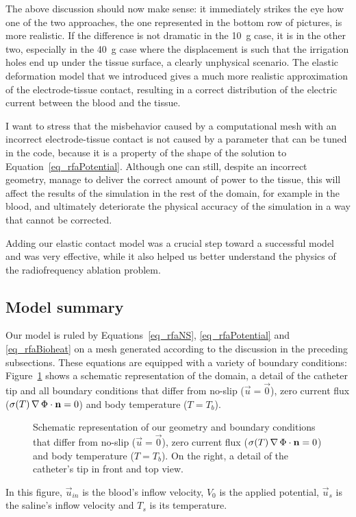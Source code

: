 The above discussion should now make sense: it immediately strikes the eye how one of the two approaches, the one represented in the bottom row of pictures, is more realistic.
If the difference is not dramatic in the \SI{10}{g} case, it is in the other two, especially in the \SI{40}{g} case where the displacement is such that the irrigation holes end up under the tissue surface, a clearly unphysical scenario.
The elastic deformation model that we introduced gives a much more realistic approximation of the electrode-tissue contact, resulting in a correct distribution of the electric current between the blood and the tissue.

I want to stress that the misbehavior caused by a computational mesh with an incorrect electrode-tissue contact is not caused by a parameter that can be tuned in the code, because it is a property of the shape of the solution to Equation~\eqref{eq_rfaPotential}.
Although one can still, despite an incorrect geometry, manage to deliver the correct amount of power to the tissue, this will affect the results of the simulation in the rest of the domain, for example in the blood, and ultimately deteriorate the physical accuracy of the simulation in a way that cannot be corrected.

Adding our elastic contact model was a crucial step toward a successful model and was very effective, while it also helped us better understand the physics of the radiofrequency ablation problem.


\subsection{Model summary}
\label{sub_rfaSummary}
Our model is ruled by Equations~\eqref{eq_rfaNS}, \eqref{eq_rfaPotential} and \eqref{eq_rfaBioheat} on a mesh generated according to the discussion in the preceding subsections.
These equations are equipped with a variety of boundary conditions: Figure~\ref{fig_rfa_bcs} shows a schematic representation of the domain, a detail of the catheter tip and all boundary conditions that differ from no-slip (\(\vec{u} = \vec{0}\)), zero current flux (\(\sigma(T)\operatorname{\nabla}\Phi \cdot \mathbf{n} = 0\)) and body temperature (\(T = T_b\)).
\begin{figure}
  \centering
    \def\svgwidth{\columnwidth}
    
    \caption{Schematic representation of our geometry and boundary conditions that differ from no-slip (\(\vec{u} = \vec{0}\)), zero current flux (\(\sigma(T)\operatorname{\nabla}\Phi \cdot \mathbf{n} = 0\)) and body temperature (\(T = T_b\)). On the right, a detail of the catheter's tip in front and top view.}
    \label{fig_rfa_bcs}
\end{figure}
In this figure, \(\vec{u}_{in}\) is the blood's inflow velocity, \(V_0\) is the applied potential, \(\vec{u}_s\) is the saline's inflow velocity and \(T_s\) is its temperature.

